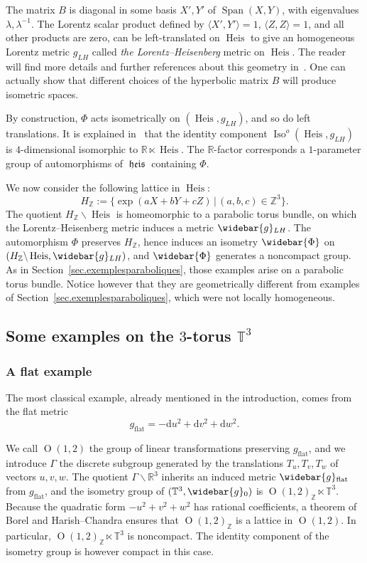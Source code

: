 \documentclass[11pt]{article}
\theoremstyle{definition}
\numberwithin{equation}{section}
\numberwithin{figure}{section}
\numberwithin{table}{section}
\DeclareMathOperator{\Iso}{Iso}
\DeclareMathOperator{\Omp}{O}%
\DeclareMathOperator{\Span}{Span}
\DeclareMathOperator{\flatm}{flat}
\DeclareMathOperator{\heis}{{\mathfrak{heis}}}
\DeclareMathOperator{\Heis}{Heis}
\newcommand*\TT{\mathbb{T}}
\newcommand*\RR{\mathbb{R}}
\newcommand*\ZZ{\mathbb{Z}}
\let\oldbar\bar
\renewcommand*{\bar}[1]{\mathchoice{\widebar{#1}}{\widebar{#1}}{\oldbar{#1}}{\oldbar{#1}}}
\renewcommand*{\overline}{\bar}
\newcommand*{\dd}{\mathrm{d}}
\newcommand*{\du}{\dd u}
\newcommand*{\dv}{\dd v}
\newcommand*{\dw}{\dd w}
\begin{document}
The matrix $B$ is diagonal in some basis $X',Y'$ of $\Span(X,Y)$, with eigenvalues $\lambda,\lambda^{-1}$. The Lorentz scalar product defined by $\langle X',Y'\rangle=1$, $\langle Z,Z\rangle=1$, and all other products are zero, can be left-translated on $\Heis$ to give an homogeneous Lorentz metric $g_{LH}$ called \emph{the Lorentz--Heisenberg} metric on $\Heis$. The reader will find more details and further references about this geometry in~\cite[Section~4.1]{sorin.ghani}. One can actually show that different choices of the hyperbolic matrix $B$ will produce isometric spaces.

By construction, $\Phi$ acts isometrically on $(\Heis,g_{LH})$, and so do left translations. It is explained in~\cite[Section~4.1]{sorin.ghani} that the identity component $\Iso^o(\Heis, g_{LH})$ is $4$-dimensional isomorphic to $\RR \ltimes \Heis$. The $\RR$-factor corresponds a $1$-parameter group of automorphisms of $\heis$ containing $\Phi$.

We now consider the following lattice in $\Heis$:
\[
H_{\ZZ}:=\{ \exp(aX+bY+cZ) \, | \, (a,b,c) \in \ZZ^3 \}.
\]
The quotient $H_{\ZZ} \backslash \Heis$ is homeomorphic to a parabolic torus bundle, on which the Lorentz--Heisenberg metric induces a metric $\overline{g}_{LH}$. The automorphism $\Phi$ preserves $H_{\ZZ}$, hence induces an isometry $\overline{\Phi}$ on $(H_{\ZZ} \backslash \Heis,\overline{g}_{LH})$, and $\overline{\Phi}$ generates a noncompact group. As in Section~\ref{sec.exemplesparaboliques}, those examples arise on a parabolic torus bundle. Notice however that they are geometrically different from examples of Section~\ref{sec.exemplesparaboliques}, which were not locally homogeneous.

\subsection{Some examples on the \texorpdfstring{$3$}{3}-torus \texorpdfstring{$\TT^3$}{TT3}}\label{sec.exemplestorus}



\subsubsection{A flat example}\label{sec.exemplestorus1}
The most classical example, already mentioned in the introduction, comes from the flat metric
\[
g_{\flatm}=-\du^2+\dv^2+\dw^2.
\]

We call $\Omp(1,2)$ the group of linear transformations preserving $g_{\flatm}$, and we introduce $\Gamma$ the discrete subgroup generated by the translations $T_u,T_v,T_w$ of vectors $u,v,w$. The quotient $\Gamma \backslash \RR^3$ inherits an induced metric $\overline{g}_{\flatm}$ from $g_{\flatm}$, and the isometry group of $(\TT^3,\overline{g}_0)$ is $\Omp(1,2)_{\ZZ} \ltimes \TT^3$. Because the quadratic form $-u^2+v^2+w^2$ has rational coefficients, a theorem of Borel and Harish--Chandra ensures that $\Omp(1,2)_{\ZZ}$ is a lattice in $\Omp(1,2)$. In particular, $\Omp(1,2)_{\ZZ} \ltimes \TT^3$ is noncompact. The identity component of the isometry group is however compact in this case.
\end{document}
